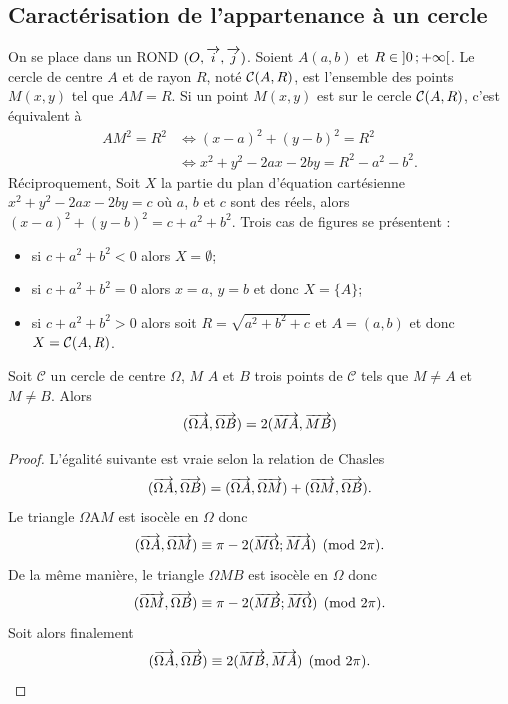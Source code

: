 \subsection{Caractérisation de l'appartenance à un cercle}
\label{sec:caractcercle}
On se place dans un ROND $(O,\overrightarrow{i},\overrightarrow{j})$. Soient $A(a,b)$ et $R \in \left] 0 \, ;  +\infty \right[$. Le cercle de centre $A$ et de rayon $R$, noté $\mathcal{C}(A,R)$, est l'ensemble des points $M(x,y)$ tel que $AM=R$. Si un point $M(x,y)$ est sur le cercle $\mathcal{C}(A,R)$, c'est équivalent à
\begin{align}
  AM^2=R^2 & \iff (x-a)^2+(y-b)^2=R^2\\
&\iff x^2+y^2-2ax-2by=R^2-a^2-b^2.
\end{align}
Réciproquement, Soit $X$ la partie du plan d'équation cartésienne $x^2+y^2-2ax-2by=c$ où $a$, $b$ et $c$ sont des réels, alors $(x-a)^2+(y-b)^2=c+a^2+b^2$. Trois cas de figures se présentent :
\begin{itemize}
\item si $c+a^2+b^2<0$ alors $X=\emptyset$;
\item si $c+a^2+b^2=0$ alors $x=a$, $y=b$ et donc $X=\{A\}$;
\item si $c+a^2+b^2>0$ alors soit $R=\sqrt{a^2+b^2+c}$ et $A=(a,b)$ et donc $X=\mathcal{C}(A,R)$.
\end{itemize}
\begin{prop}
  \label{prop:cocy}
  Soit $\mathcal{C}$ un cercle de centre $\Omega$, $M$ $A$ et $B$ trois points de $\mathcal{C}$ tels que $M \neq A$ et $M \neq B$. Alors 
  \begin{equation}
    (\overrightarrow{\Omega A},\overrightarrow{\Omega B})=2 (\overrightarrow{MA},\overrightarrow{MB})
  \end{equation}
\end{prop}
\begin{proof}
  L'égalité suivante est vraie selon la relation de Chasles
  \begin{equation}
    (\overrightarrow{\Omega A},\overrightarrow{\Omega B}) = (\overrightarrow{\Omega A},\overrightarrow{\Omega M}) + (\overrightarrow{\Omega M},\overrightarrow{\Omega B}).
  \end{equation}
  Le triangle $\Omega $A$ M$ est isocèle en $\Omega$ donc
  \begin{equation}
    (\overrightarrow{\Omega A}, \overrightarrow{\Omega M}) \equiv \pi - 2 (\overrightarrow{M\Omega}; \overrightarrow{MA}) \pmod {2\pi}.
  \end{equation}
  De la même manière, le triangle $\Omega M B$ est isocèle en $\Omega$ donc
  \begin{equation}
    (\overrightarrow{\Omega M}, \overrightarrow{\Omega B}) \equiv \pi - 2 (\overrightarrow{MB}; \overrightarrow{M\Omega}) \pmod {2\pi}.
  \end{equation}
  Soit alors finalement 
  \begin{equation}
    (\overrightarrow{\Omega A}, \overrightarrow{\Omega B}) \equiv 2 (\overrightarrow{MB}, \overrightarrow{MA}) \pmod {2\pi}.
\end{equation}
\end{proof}
